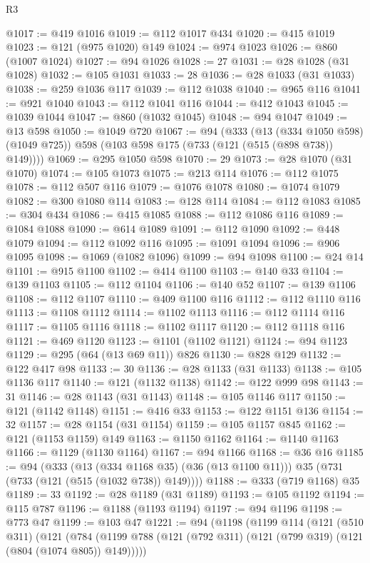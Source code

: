 \begin{lexlean}{R3}
\begin{coremodule}
{{{{{{{{{{{{{{{{{{{{{{{{{{{{{{{{{{{{{{{{{{{{{{{{{{{{{{{{{{{{{{{{{{{{{{{{{{{@1017 := @419 @1016
@1019 := @112 @1017 @434
@1020 := @415 @1019
@1023 := @121 (@975 @1020) @149
@1024 := @974 @1023
@1026 := @860 (@1007 @1024)
@1027 := @94 @1026
@1028 := 27
@1031 := @28 @1028 (@31 @1028)
@1032 := @105 @1031
@1033 := 28
@1036 := @28 @1033 (@31 @1033)
@1038 := @259 @1036 @117
@1039 := @112 @1038
@1040 := @965 @116
@1041 := @921 @1040
@1043 := @112 @1041 @116
@1044 := @412 @1043
@1045 := @1039 @1044
@1047 := @860 (@1032 @1045)
@1048 := @94 @1047
@1049 := @13 @598
@1050 := @1049 @720
@1067 := @94
    (@333
      (@13 (@334 @1050 @598) (@1049 @725))
      @598
      (@103 @598 @175 (@733 (@121 (@515 (@898 @738)) @149))))
@1069 := @295 @1050 @598
@1070 := 29
@1073 := @28 @1070 (@31 @1070)
@1074 := @105 @1073
@1075 := @213 @114
@1076 := @112 @1075
@1078 := @112 @507 @116
@1079 := @1076 @1078
@1080 := @1074 @1079
@1082 := @300 @1080 @114
@1083 := @128 @114
@1084 := @112 @1083
@1085 := @304 @434
@1086 := @415 @1085
@1088 := @112 @1086 @116
@1089 := @1084 @1088
@1090 := @614 @1089
@1091 := @112 @1090
@1092 := @448 @1079
@1094 := @112 @1092 @116
@1095 := @1091 @1094
@1096 := @906 @1095
@1098 := @1069 (@1082 @1096)
@1099 := @94 @1098
@1100 := @24 @14
@1101 := @915 @1100
@1102 := @414 @1100
@1103 := @140 @33
@1104 := @139 @1103
@1105 := @112 @1104
@1106 := @140 @52
@1107 := @139 @1106
@1108 := @112 @1107
@1110 := @409 @1100 @116
@1112 := @112 @1110 @116
@1113 := @1108 @1112
@1114 := @1102 @1113
@1116 := @112 @1114 @116
@1117 := @1105 @1116
@1118 := @1102 @1117
@1120 := @112 @1118 @116
@1121 := @469 @1120
@1123 := @1101 (@1102 @1121)
@1124 := @94 @1123
@1129 := @295 (@64 (@13 @69 @11)) @826
@1130 := @828 @129
@1132 := @122 @417 @98
@1133 := 30
@1136 := @28 @1133 (@31 @1133)
@1138 := @105 @1136 @117
@1140 := @121 (@1132 @1138)
@1142 := @122 @999 @98
@1143 := 31
@1146 := @28 @1143 (@31 @1143)
@1148 := @105 @1146 @117
@1150 := @121 (@1142 @1148)
@1151 := @416 @33
@1153 := @122 @1151 @136
@1154 := 32
@1157 := @28 @1154 (@31 @1154)
@1159 := @105 @1157 @845
@1162 := @121 (@1153 @1159) @149
@1163 := @1150 @1162
@1164 := @1140 @1163
@1166 := @1129 (@1130 @1164)
@1167 := @94 @1166
@1168 := @36 @16
@1185 := @94
    (@333
      (@13 (@334 @1168 @35) (@36 (@13 @1100 @11)))
      @35
      (@731 (@733 (@121 (@515 (@1032 @738)) @149))))
@1188 := @333 (@719 @1168) @35
@1189 := 33
@1192 := @28 @1189 (@31 @1189)
@1193 := @105 @1192
@1194 := @115 @787
@1196 := @1188 (@1193 @1194)
@1197 := @94 @1196
@1198 := @773 @47
@1199 := @103 @47
@1221 := @94
    (@1198
      (@1199
        @114
        (@121
          (@510 @311)
          (@121
            (@784
              (@1199 @788 (@121 (@792 @311) (@121 (@799 @319) (@121 (@804 (@1074 @805)) @149)))))
}}}}}}}}}}}}}}}}}}}}}}}}}}}}}}}}}}}}}}}}}}}}}}}}}}}}}}}}}}}}}}}}}}}}}}}}}}}
\end{coremodule}
\end{lexlean}
